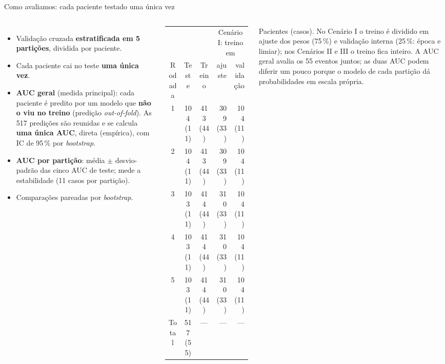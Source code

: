 \documentclass[10pt,aspectratio=169]{beamer}
\newcommand{\fonte}[1]{\par\vfill{\scriptsize\color{cinza}#1}}
\begin{document}
\begin{frame}{Como avaliamos: cada paciente testado uma única vez}
  \begin{columns}[T]
    \small
    \begin{itemize}
      \item Validação cruzada \textbf{estratificada em 5 partições}, dividida
        por paciente.
      \item Cada paciente cai no teste \textbf{uma única vez}.
      \item \textbf{AUC geral} (medida principal): cada paciente é predito por um
        modelo que \textbf{não o viu no treino} (predição \textit{out-of-fold}).
        As 517 predições são reunidas e se calcula \textbf{uma única AUC}, direta
        (empírica), com IC de 95\,\% por \textit{bootstrap}.
      \item \textbf{AUC por partição}: média $\pm$ desvio-padrão das cinco AUC
        de teste; mede a estabilidade (11 casos por partição).
      \item Comparações pareadas por \textit{bootstrap}.
    \end{itemize}
    \centering
    \footnotesize
    \setlength{\tabcolsep}{3pt}
    \begin{tabular}{cccrr}
      \toprule
       &  &  & \multicolumn{2}{c}{Cenário I: treino em} \\
      \cmidrule(lr){4-5}
      Rodada & Teste & Treino & ajuste & validação \\
      \midrule
      1 & 104 (11) & 413 (44) & 309 (33) & 104 (11) \\
      2 & 104 (11) & 413 (44) & 309 (33) & 104 (11) \\
      3 & 103 (11) & 414 (44) & 310 (33) & 104 (11) \\
      4 & 103 (11) & 414 (44) & 310 (33) & 104 (11) \\
      5 & 103 (11) & 414 (44) & 310 (33) & 104 (11) \\
      \midrule
      Total & 517 (55) & --- & --- & --- \\
      \bottomrule
    \end{tabular}
    \fonte{Pacientes (casos). No Cenário I o treino é dividido em ajuste dos pesos (75\,\%) e validação interna (25\,\%: época e limiar); nos Cenários II e III o treino fica inteiro. A AUC geral avalia os 55 eventos juntos; as duas AUC podem diferir um pouco porque o modelo de cada partição dá probabilidades em escala própria.}
  \end{columns}
\end{frame}
\end{document}
